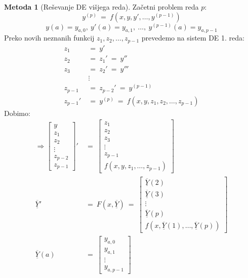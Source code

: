 \documentclass[11pt]{article}
\theoremstyle{definition}
\theoremstyle{definition}
\newtheorem*{metoda}{Metoda}
\begin{document}
\begin{metoda}[Reševanje DE višjega reda]

Začetni problem reda $p$:
$$y^{(p)} ~=~ f(x, y, y', \ldots, y^{(p-1)})$$
$$y(a) = y_{a, 0}, ~y'(a) = y_{a, 1}, ~\ldots, ~y^{(p-1)}(a) = y_{a, p-1}$$
Preko novih neznanih funkcij $z_1, z_2, \ldots, z_{p-1}$ prevedemo na sistem DE 1. reda:
\begin{align*}
z_1 ~&=~ y' \\
z_2 ~&=~ z_1' ~=~ y'' \\
z_3 ~&=~ z_2' ~=~ y''' \\
&\vdots \\
z_{p-1} ~&=~ z_{p-2}' ~=~ y^{(p-1)} \\
z_{p-1}' ~&=~ y^{(p)} ~=~ f(x, y, z_1, z_2, \ldots, z_{p-1})
\end{align*}
Dobimo:
\begin{align*}
\Longrightarrow \begin{bmatrix}
y \\
z_1 \\
z_2 \\
\vdots \\
z_{p-2} \\
z_{p-1}
\end{bmatrix}' ~&=~ \begin{bmatrix}
z_1 \\
z_2 \\
z_3 \\
\vdots \\
z_{p-1} \\
f(x, y, z_1, \ldots, z_{p-1})
\end{bmatrix} \\
\overline{\underline{Y}}' ~&=~ F(x, \overline{\underline{Y}}) ~=~ \begin{bmatrix}
\overline{\underline{Y}}(2) \\
\overline{\underline{Y}}(3) \\
\vdots \\
\overline{\underline{Y}}(p) \\
f(x, \overline{\underline{Y}}(1), \ldots, \overline{\underline{Y}}(p))
\end{bmatrix} \\
\overline{\underline{Y}}(a) ~&=~ \begin{bmatrix}
y_{a, 0} \\
y_{a, 1} \\
\vdots \\
y_{a, p-1}
\end{bmatrix}
\end{align*}

\end{metoda}
\vspace{0.5cm}
\end{document}

